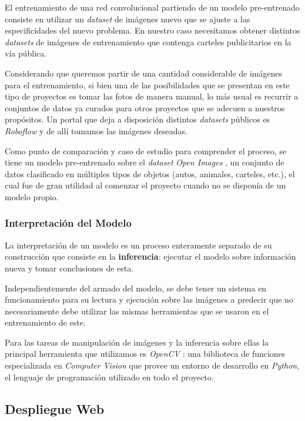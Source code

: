 \documentclass[a4paper]{article}
\begin{document}
El entrenamiento de una red convolucional partiendo de un modelo pre-entrenado consiste en utilizar un \textit{dataset} de imágenes nuevo que se ajuste a las especificidades del nuevo problema. En nuestro caso necesitamos obtener distintos \textit{datasets} de imágenes de entrenamiento que contenga carteles publicitarios en la vía pública.

Considerando que queremos partir de una cantidad considerable de imágenes para el entrenamiento, si bien una de las posibilidades que se presentan en este tipo de proyectos es tomar las fotos de manera manual, lo más usual es recurrir a conjuntos de datos ya curados para otros proyectos que se adecuen a nuestros propósitos. Un portal que deja a disposición distintos \textit{datasets} públicos es \textit{Roboflow} \cite{roboflow} y de allí tomamos las imágenes deseadas.\medskip

Como punto de comparación y caso de estudio para comprender el proceso, se tiene un modelo pre-entrenado sobre el \textit{dataset} \textit{Open Images} \cite{openimages}, un conjunto de datos clasificado en múltiples tipos de objetos (autos, animales, carteles, etc.), el cual fue de gran utilidad al comenzar el proyecto cuando no se disponía de un modelo propio.

\subsubsection{Interpretación del Modelo}

La interpretación de un modelo es un proceso enteramente separado de su construcción que consiste en la \textbf{inferencia}: ejecutar el modelo sobre información nueva y tomar conclusiones de esta.

Independientemente del armado del modelo, se debe tener un sistema en funcionamiento para su lectura y ejecución sobre las imágenes a predecir que no necesariamente debe utilizar las mismas herramientas que se usaron en el entrenamiento de este.

Para las tareas de manipulación de imágenes y la inferencia sobre ellas la principal herramienta que utilizamos es \textit{OpenCV} \cite{opencv}: una biblioteca de funciones especializada en \textit{Computer Vision} que provee un entorno de desarrollo en \textit{Python}, el lenguaje de programación utilizado en todo el proyecto.

\subsection{Despliegue Web}
\end{document}
